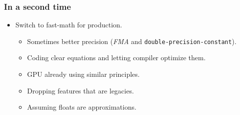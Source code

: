 \documentclass{beamer}
\begin{document}
\begin{frame}[fragile]
    \frametitle{In a second time}

    \begin{itemize}
        \item Switch to fast-math for production.
              \begin{itemize}
                  \item Sometimes better precision (\emph{FMA} and \verb'double-precision-constant').
                  \item Coding clear equations and letting compiler optimize them.
                  \item GPU already using similar principles.
                  \item Dropping features that are legacies.
                  \item Assuming floats are approximations.
              \end{itemize}
    \end{itemize}
\end{frame}
\end{document}
